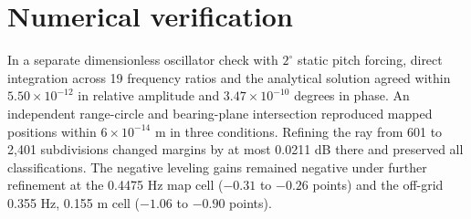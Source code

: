 \section{Numerical verification}
In a separate dimensionless oscillator check with $2^\circ$ static pitch forcing, direct integration across 19 frequency ratios and the analytical solution agreed within $5.50\times10^{-12}$ in relative amplitude and $3.47\times10^{-10}$ degrees in phase. An independent range-circle and bearing-plane intersection reproduced mapped positions within $6\times10^{-14}$ m in three conditions. Refining the ray from 601 to 2,401 subdivisions changed margins by at most 0.0211 dB there and preserved all classifications. The negative leveling gains remained negative under further refinement at the 0.4475 Hz map cell ($-0.31$ to $-0.26$ points) and the off-grid 0.355 Hz, 0.155 m cell ($-1.06$ to $-0.90$ points).
